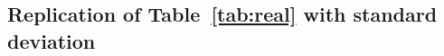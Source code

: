 \documentclass{article}
\newcommand{\xhdr}[1]{\noindent\textbf{#1.}}
\renewcommand{\cite}{\citep}
\begin{document}



\subsection{Replication of  Table~\ref{tab:real} with standard deviation}
\label{app:app:subset}


\end{document}
